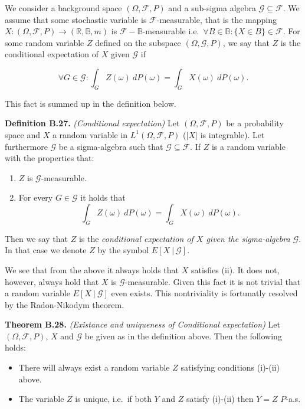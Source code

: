 \documentclass[
]{article}
\providecommand{\tightlist}{%
  \setlength{\itemsep}{0pt}\setlength{\parskip}{0pt}}
\begin{document}
We consider a background space \((\Omega,\mathcal{F},P)\) and a
sub-sigma algebra \(\mathcal{G}\subseteq \mathcal{F}\). We assume that
some stochastic variable is \(\mathcal{F}\)-measurable, that is the
mapping \(X : (\Omega,\mathcal{F},P) \to (\mathbb{R},\mathbb{B},m)\) is
\(\mathcal{F}-\mathbb{B}\)-measurable
i.e.~\(\forall B\in\mathbb{B} : \{X\in B\}\in\mathcal{F}\). For some
random variable \(Z\) defined on the subspace
\((\Omega,\mathcal{G},P)\), we say that \(Z\) is the conditional
expectation of \(X\) given \(\mathcal{G}\) if

\[
\forall G\in\mathcal{G} : \int_G Z(\omega)\ dP(\omega)=\int_G X(\omega)\ dP(\omega).
\]

This fact is summed up in the definition below.

\textbf{Definition B.27.} \emph{(Conditional expectation)} Let
\((\Omega,\mathcal{F},P)\) be a probability space and \(X\) a random
variable in \(L^1(\Omega,\mathcal{F},P)\) (\(\vert X\vert\) is
integrable). Let furthermore \(\mathcal{G}\) be a sigma-algebra such
that \(\mathcal{G}\subseteq \mathcal{F}\). If \(Z\) is a random variable
with the properties that:

\begin{enumerate}
\def\labelenumi{\roman{enumi}.}
\tightlist
\item
  \(Z\) is \(\mathcal{G}\)-measurable.
\item
  For every \(G\in\mathcal{G}\) it holds that
  \[\int_G Z(\omega)\ dP(\omega)=\int_G X(\omega)\ dP(\omega).\]
\end{enumerate}

Then we say that \(Z\) is the \emph{conditional expectation of \(X\)
given the sigma-algebra \(\mathcal{G}\)}. In that case we denote \(Z\)
by the symbol \(E[X\ \vert\ \mathcal{G}]\).

We see that from the above it always holds that \(X\) satisfies (ii). It
does not, however, always hold that \(X\) is \(\mathcal{G}\)-measurable.
Given this fact it is not trivial that a random variable
\(E[X\ \vert\ \mathcal{G}]\) even exists. This nontriviality is
fortunatly resolved by the Radon-Nikodym theorem.

\textbf{Theorem B.28.} \emph{(Existance and uniqueness of Conditional
expectation)} Let \((\Omega,\mathcal{F},P)\), \(X\) and \(\mathcal{G}\)
be given as in the definition above. Then the following holds:

\begin{itemize}
\tightlist
\item
  There will always exist a random variable \(Z\) satisfying conditions
  (i)-(ii) above.
\item
  The variable \(Z\) is unique, i.e.~if both \(Y\) and \(Z\) satisfy
  (i)-(ii) then \(Y=Z\) \(P\)-a.s.
\end{itemize}
\end{document}
